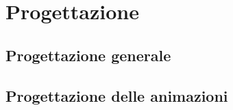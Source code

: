 
\chapter{Progettazione} %

\label{Chapter4} %


\section{Progettazione generale}
\section{Progettazione delle animazioni}

